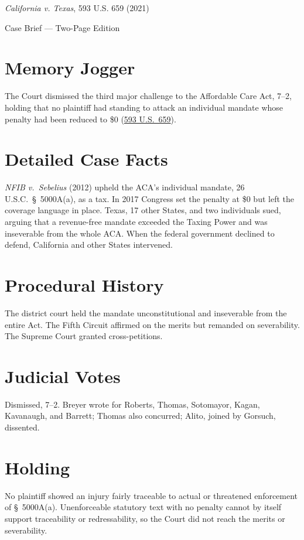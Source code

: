 \documentclass[12pt]{article}
\begin{document}
\begin{center}
{\LARGE \textit{California v. Texas}, 593 U.S. 659 (2021)\par}
\vspace{0.5em}
{\large Case Brief --- Two-Page Edition\par}
\end{center}

\section{Memory Jogger}
The Court dismissed the third major challenge to the Affordable Care Act, 7--2, holding that no plaintiff had standing to attack an individual mandate whose penalty had been reduced to \$0 (\href{https://www.courtlistener.com/opinion/4892571/california-v-texas/}{593 U.S.\ 659}).

\section{Detailed Case Facts}
\textit{NFIB v.\ Sebelius} (2012) upheld the ACA's individual mandate, 26 U.S.C.\ \S\ 5000A(a), as a tax. In 2017 Congress set the penalty at \$0 but left the coverage language in place. Texas, 17 other States, and two individuals sued, arguing that a revenue-free mandate exceeded the Taxing Power and was inseverable from the whole ACA. When the federal government declined to defend, California and other States intervened.

\section{Procedural History}
The district court held the mandate unconstitutional and inseverable from the entire Act. The Fifth Circuit affirmed on the merits but remanded on severability. The Supreme Court granted cross-petitions.

\section{Judicial Votes}
Dismissed, 7--2. Breyer wrote for Roberts, Thomas, Sotomayor, Kagan, Kavanaugh, and Barrett; Thomas also concurred; Alito, joined by Gorsuch, dissented.

\section{Holding}
No plaintiff showed an injury fairly traceable to actual or threatened enforcement of \S\ 5000A(a). Unenforceable statutory text with no penalty cannot by itself support traceability or redressability, so the Court did not reach the merits or severability.
\end{document}
